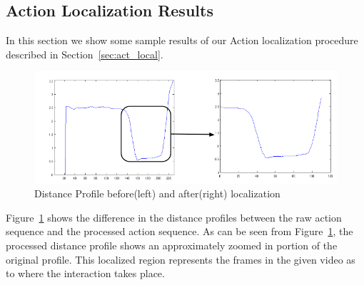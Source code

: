 \documentclass[10pt,twocolumn,letterpaper]{article}
\begin{document}






\subsection{Action Localization Results}
In this section we show some sample results of our Action localization procedure described in Section~\ref{sec:act_local}. 
\begin{figure}[ht]

\includegraphics[scale=0.3]{act_local.png}
\caption{Distance Profile before(left) and after(right) localization}
\label{Fig:act_loc}

\end{figure}
Figure~\ref{Fig:act_loc} shows the difference in the distance profiles between the raw action sequence and the processed action sequence. As can be seen from Figure~\ref{Fig:act_loc}, the processed distance profile shows an approximately zoomed in portion of the original profile. This localized region represents the frames in the given video as to where the interaction takes place. 
\end{document}
